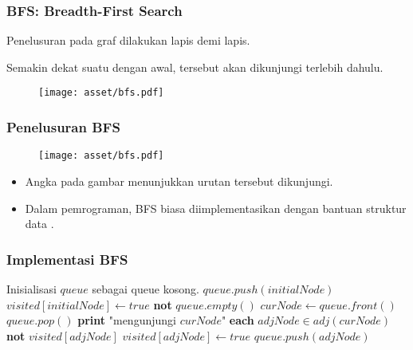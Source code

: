 \begin{frame}
\frametitle{BFS: Breadth-First Search}
Penelusuran \fnode pada graf dilakukan lapis demi lapis. 

Semakin dekat suatu \fnode dengan \fnode awal, \fnode tersebut akan dikunjungi terlebih dahulu. 

\begin{figure}
  \centering
  \texttt{[image: asset/bfs.pdf]}
\end{figure}
\end{frame}

\begin{frame}
\frametitle{Penelusuran BFS}
\begin{figure}
  \centering
  \texttt{[image: asset/bfs.pdf]}
\end{figure}
\begin{itemize}
  \item Angka pada gambar menunjukkan urutan \fnode tersebut dikunjungi.
  \item Dalam pemrograman, BFS biasa diimplementasikan dengan bantuan struktur data .
\end{itemize}
\end{frame}

\begin{frame}[fragile]
\frametitle{Implementasi BFS}
%
%        
\begin{codebox}
  \li \Comment Inisialisasi $queue$ sebagai queue kosong.
  \li $queue.push(initialNode)$
  \li $visited[initialNode] \gets true$
  \li \While \textbf{not} $queue.empty()$ \Do
  \li   $curNode \gets queue.front()$
  \li   $queue.pop()$
  \li   \textbf{print} "mengunjungi $curNode$"
  \li   \For \textbf{each} $adjNode \in adj(curNode)$ \Do
  \li     \If \textbf{not} $visited[adjNode]$ \Then
  \li       $visited[adjNode] \gets true$
  \li       $queue.push(adjNode)$
          \End
        \End
      \End
\end{codebox}
\end{frame}

